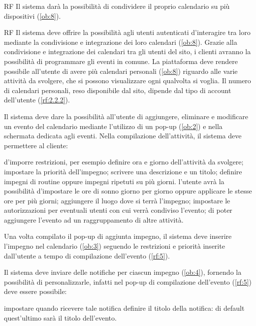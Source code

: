 \begin{listaPersonale}{RF}
	 Il sistema darà la possibilità di condividere il proprio calendario su più dispositivi (\ref{ob:8}).

	\begin{listaPersonale2}{RF}
		 Il sistema deve offrire la possibilità agli utenti autenticati d'interagire tra loro mediante la condivisione e integrazione dei loro calendari (\ref{ob:8}). Grazie alla condivisione e integrazione dei calendari tra gli utenti del sito, i clienti avranno la possibilità di programmare gli eventi in comune.
		 La piattaforma deve rendere possibile all’utente di avere più calendari personali (\ref{ob:8}) riguardo alle varie attività da svolgere, che si possono visualizzare ogni qualvolta si voglia. Il numero di calendari personali, reso disponibile dal sito, dipende dal tipo di account dell’utente (\ref{rf:2.2.2}).
	\end{listaPersonale2}

	 Il sistema deve dare la possibilità all'utente di aggiungere, eliminare e modificare un evento del calendario mediante l'utilizzo di un pop-up (\ref{ob:2}) e nella schermata dedicata agli eventi. Nella compilazione dell'attività, il sistema deve permettere al cliente:
	\begin{listaPersonale2}{}
		 d'imporre restrizioni, per esempio definire ora e giorno dell'attività da svolgere;
		 impostare la priorità dell'impegno;
		 scrivere una descrizione e un titolo;
		 definire impegni di routine oppure impegni ripetuti su più giorni.
		 l'utente avrà la possibilità d'impostare le ore di sonno giorno per giorno oppure applicare le stesse ore per più giorni;
		 aggiungere il luogo dove si terrà l'impegno;
		 impostare le autorizzazioni per eventuali utenti con cui verrà condiviso l'evento;
		 di poter aggiungere l'evento ad un raggruppamento di altre attività.
	\end{listaPersonale2}


	 Una volta compilato il pop-up di aggiunta impegno, il sistema deve inserire l'impegno nel calendario (\ref{ob:3}) seguendo le restrizioni e priorità inserite dall'utente a tempo di compilazione dell'evento (\ref{rf:5}).

	 Il sistema deve inviare delle notifiche per ciascun impegno (\ref{ob:4}), fornendo la possibilità di personalizzarle, infatti nel pop-up di compilazione dell'evento (\ref{rf:5}) deve essere possibile:
	\begin{listaPersonale2}{}
		 impostare quando ricevere tale notifica
		 definire il titolo della notifica: di default quest'ultimo sarà il titolo dell'evento.
	\end{listaPersonale2}


\end{listaPersonale}
